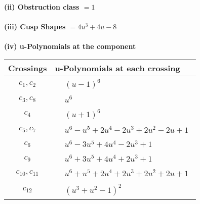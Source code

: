 \documentclass[1p]{elsarticle_modified}
\theoremstyle{definition}
\begin{document}
\flushleft \textbf{(ii) Obstruction class $= 1$}\\~\\
\flushleft \textbf{(iii) Cusp Shapes $= 4 u^3+4 u-8$}\\~\\
\newpage\renewcommand{\arraystretch}{1}
\flushleft \textbf{(iv) u-Polynomials at the component}\newline \\
\begin{tabular}{m{50pt}|m{274pt}}
Crossings & \hspace{64pt}u-Polynomials at each crossing \\
\hline $$\begin{aligned}c_{1},c_{2}\end{aligned}$$&$\begin{aligned}
&(u-1)^6
\end{aligned}$\\
\hline $$\begin{aligned}c_{3},c_{8}\end{aligned}$$&$\begin{aligned}
&u^6
\end{aligned}$\\
\hline $$\begin{aligned}c_{4}\end{aligned}$$&$\begin{aligned}
&(u+1)^6
\end{aligned}$\\
\hline $$\begin{aligned}c_{5},c_{7}\end{aligned}$$&$\begin{aligned}
&u^6- u^5+2 u^4-2 u^3+2 u^2-2 u+1
\end{aligned}$\\
\hline $$\begin{aligned}c_{6}\end{aligned}$$&$\begin{aligned}
&u^6-3 u^5+4 u^4-2 u^3+1
\end{aligned}$\\
\hline $$\begin{aligned}c_{9}\end{aligned}$$&$\begin{aligned}
&u^6+3 u^5+4 u^4+2 u^3+1
\end{aligned}$\\
\hline $$\begin{aligned}c_{10},c_{11}\end{aligned}$$&$\begin{aligned}
&u^6+u^5+2 u^4+2 u^3+2 u^2+2 u+1
\end{aligned}$\\
\hline $$\begin{aligned}c_{12}\end{aligned}$$&$\begin{aligned}
&(u^3+u^2-1)^2
\end{aligned}$\\
\hline
\end{tabular}\\~\\
\end{document}
